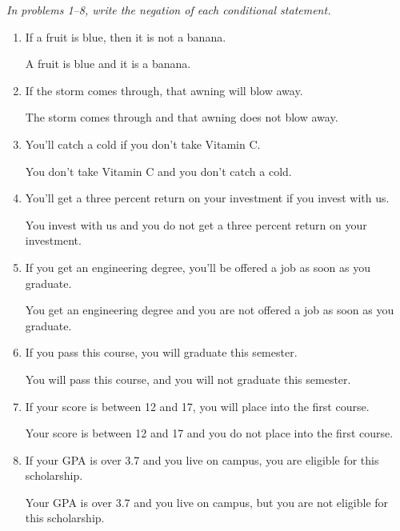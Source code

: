 \emph{In problems 1--8, write the negation of each conditional statement.}
\begin{enumerate}
\item If a fruit is blue, then it is not a banana. \\ 
\begin{framed}
A fruit is blue and it is a banana.
\end{framed}

\item If the storm comes through, that awning will blow away. \\ 
\begin{framed}
The storm comes through and that awning does not blow away.
\end{framed}

\item You'll catch a cold if you don't take Vitamin C. \\ 
\begin{framed}
You don't take Vitamin C and you don't catch a cold.
\end{framed}
\pagebreak

\item You'll get a three percent return on your investment if you invest with us. \\ 
\begin{framed}
You invest with us and you do not get a three percent return on your investment.
\end{framed}

\item If you get an engineering degree, you'll be offered a job as soon as you graduate. \\ 
\begin{framed}
You get an engineering degree and you are not offered a job as soon as you graduate.
\end{framed}

\item If you pass this course, you will graduate this semester. \\ 
\begin{framed}
You will pass this course, and you will not graduate this semester.
\end{framed}

\item If your score is between 12 and 17, you will place into the first course. \\ 
\begin{framed}
Your score is between 12 and 17 and you do not place into the first course.
\end{framed}

\item If your GPA is over 3.7 and you live on campus, you are eligible for this scholarship. \\ \begin{framed}
Your GPA is over 3.7 and you live on campus, but you are not eligible for this scholarship.
\end{framed}
\end{enumerate}

